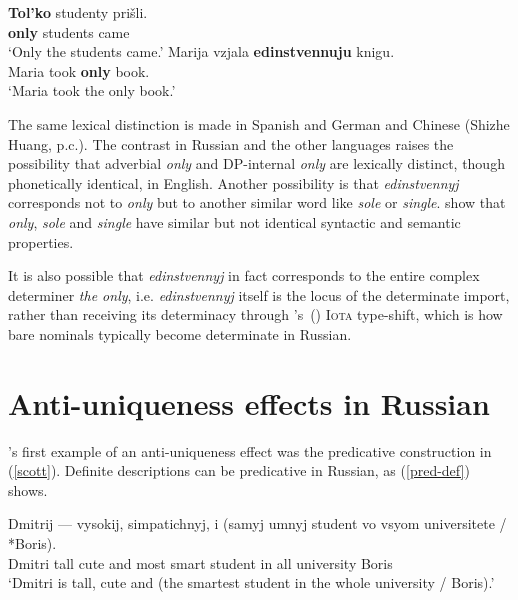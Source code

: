 \documentclass{article}
\newcommand{\citegen}[1]{\citeauthor{#1}'s~(\citeyear{#1})}
\begin{document}
\begin{exe}
	\ex \label{only-tolko} \gll \textbf{Tol'ko} studenty pri\v{s}li.\\
	\textbf{only} students came\\
	\glt `Only the students came.'
	\ex \label{only-edin} \gll Marija vzjala \textbf{edinstvennuju} knigu.\\
	Maria took \textbf{only} book.\\
	\glt `Maria took the only book.'
\end{exe}

The same lexical distinction is made in Spanish and German \citep{mcnally08} and Chinese (Shizhe Huang, p.c.). The contrast in Russian and the other languages raises the possibility that adverbial \textit{only} and DP-internal \textit{only} are lexically distinct, though phonetically identical, in English. Another possibility is that \textit{edinstvennyj} corresponds not to \textit{only} but to another similar word like \textit{sole} or \textit{single}. \citet{cb2012a} show that \textit{only}, \textit{sole} and \textit{single} have similar but not identical syntactic and semantic properties.

It is also possible that \textit{edinstvennyj} in fact corresponds to the entire complex determiner \textit{the only}, i.e. \textit{edinstvennyj} itself is the locus of the determinate import, rather than receiving its determinacy through \citegen{partee86} \textsc{Iota} type-shift, which is how bare nominals typically become determinate in Russian.



\section{Anti-uniqueness effects in Russian \label{sec:anti-uniqueness}}
\citeauthor{cb2015}'s first example of an anti-uniqueness effect was the predicative construction in (\ref{scott}). Definite descriptions can be predicative in Russian, as (\ref{pred-def}) shows.

\begin{exe}
	\ex \label{pred-def} \gll Dmitrij --- vysokij, simpatichnyj, i (samyj umnyj student vo vsyom universitete / *Boris).\\
	Dmitri {} tall cute and most smart student in all university {} Boris\\
	\glt `Dmitri is tall, cute and (the smartest student in the whole university / Boris).'
\end{exe}
\end{document}
